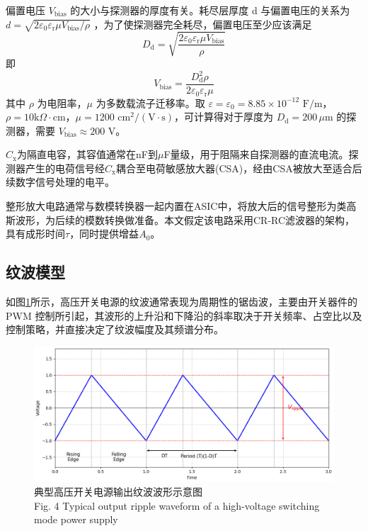 \documentclass{ctexart}
\begin{document}
偏置电压 $V_{\mathrm{bias}}$ 的大小与探测器的厚度有关。耗尽层厚度 d 与偏置电压的关系为 $d = \sqrt{2\varepsilon_0\varepsilon_{\mathrm{r}}\mu V_{\mathrm{bias}} / \rho}$ \cite{9}，为了使探测器完全耗尽，偏置电压至少应该满足
\begin{equation*}
D_{\mathrm{d}} = \sqrt{\frac{2\varepsilon_0\varepsilon_{\mathrm{r}}\mu V_{\mathrm{bias}}}{\rho}}
\end{equation*}
即
\begin{equation*}
V_{\mathrm{bias}} = \frac{D_{\mathrm{d}}^2\rho}{2\varepsilon_0\varepsilon_{\mathrm{r}}\mu}
\end{equation*}
其中 $\rho$ 为电阻率，$\mu$ 为多数载流子迁移率。取 $\varepsilon = \varepsilon_0 = 8.85 \times 10^{-12} \text{ F/m}$， $\rho = 10 \text{k}\Omega \cdot \text{cm}$，$\mu = 1200 \text{ cm}^2/(\text{V} \cdot \text{s})$，可计算得对于厚度为 $D_{\mathrm{d}} = 200\,\mu\text{m}$ 的探测器，需要 $V_{\mathrm{bias}} \approx 200 \text{ V}$。

$C_{\mathrm{x}}$为隔直电容，其容值通常在nF到$\mu$F量级，用于阻隔来自探测器的直流电流。探测器产生的电荷信号经$C_{\mathrm{x}}$耦合至电荷敏感放大器(CSA)，经由CSA被放大至适合后续数字信号处理的电平。

整形放大电路通常与数模转换器一起内置在ASIC中，将放大后的信号整形为类高斯波形，为后续的模数转换做准备。本文假定该电路采用CR-RC滤波器的架构\cite{10}，具有成形时间$\tau$，同时提供增益$A_0$。

\subsection{纹波模型}

如图\ref{fig:ripple}所示，高压开关电源的纹波通常表现为周期性的锯齿波，主要由开关器件的 PWM 控制所引起\cite{11}，其波形的上升沿和下降沿的斜率取决于开关频率、占空比以及控制策略，并直接决定了纹波幅度及其频谱分布\cite{12}。

\begin{figure}[!h]
    \centering
    \includegraphics[width=\linewidth]{./ripple.png}
    \caption{典型高压开关电源输出纹波波形示意图 \\ Fig. 4 Typical output ripple waveform of a high-voltage switching mode power supply}
    \label{fig:ripple}
\end{figure}
\end{document}
